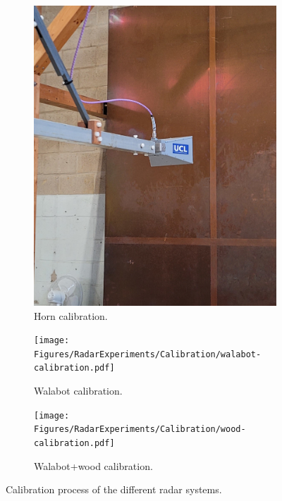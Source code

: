 \begin{figure}[t]
    \centering
    \begin{subfigure}{.32\linewidth}
        \centering
        \includegraphics[width=\linewidth,trim={0 2.3cm 0 0},clip]{Figures/RadarExperiments/Calibration/horn-calibration.pdf}
        \captionsetup{width=.99\linewidth}
        \caption{Horn calibration.}
        \label{fig:radar-experiments:calibration:horn}
    \end{subfigure}
    \begin{subfigure}{.32\linewidth}
        \centering
        \texttt{[image: Figures/RadarExperiments/Calibration/walabot-calibration.pdf]}
        \captionsetup{width=.99\linewidth}
        \caption{Walabot calibration.}
        \label{fig:radar-experiments:calibration:walabot}
    \end{subfigure}
    \begin{subfigure}{.33\linewidth}
        \centering
        \texttt{[image: Figures/RadarExperiments/Calibration/wood-calibration.pdf]}
        \captionsetup{width=.99\linewidth}
        \caption{Walabot+wood calibration.}
        \label{fig:radar-experiments:calibration:material}
    \end{subfigure}

    \caption{Calibration process of the different radar systems.}
    \label{fig:radar-experiments:calibration}
\end{figure}

